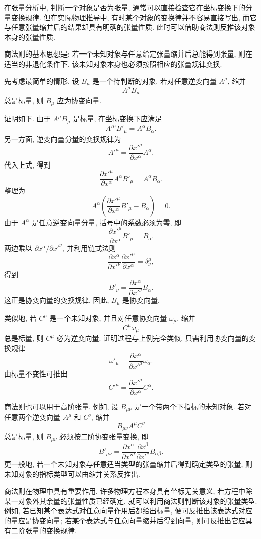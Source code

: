 在张量分析中, 判断一个对象是否为张量, 通常可以直接检查它在坐标变换下的分量变换规律. 但在实际物理推导中, 有时某个对象的变换律并不容易直接写出, 而它与任意张量缩并后的结果却具有明确的张量性质. 此时可以借助商法则反推该对象本身的张量性质. 

商法则的基本思想是: 若一个未知对象与任意给定张量缩并后总能得到张量, 则在适当的非退化条件下, 该未知对象本身也必须按照相应的张量规律变换. 

先考虑最简单的情形. 设 $B_{\mu}$ 是一个待判断的对象. 若对任意逆变向量 $A^{\mu}$, 缩并
\[
A^{\mu}B_{\mu}
\]
总是标量, 则 $B_{\mu}$ 应为协变向量. 

证明如下. 由于 $A^{\mu}B_{\mu}$ 是标量, 在坐标变换下应满足
\[
A'^{\mu}B'_{\mu}
=
A^{\alpha}B_{\alpha}.
\]
另一方面, 逆变向量分量的变换规律为
\[
A'^{\mu}
=
\frac{\partial x'^{\mu}}{\partial x^{\alpha}}A^{\alpha}.
\]
代入上式, 得到
\[
\frac{\partial x'^{\mu}}{\partial x^{\alpha}}A^{\alpha}B'_{\mu}
=
A^{\alpha}B_{\alpha}.
\]
整理为
\[
A^{\alpha}
\left(
\frac{\partial x'^{\mu}}{\partial x^{\alpha}}B'_{\mu}
-
B_{\alpha}
\right)
=
0.
\]
由于 $A^{\alpha}$ 是任意逆变向量分量, 括号中的系数必须为零, 即
\[
\frac{\partial x'^{\mu}}{\partial x^{\alpha}}B'_{\mu}
=
B_{\alpha}.
\]
两边乘以 $\partial x^{\alpha}/\partial x'^{\nu}$, 并利用链式法则
\[
\frac{\partial x^{\alpha}}{\partial x'^{\nu}}
\frac{\partial x'^{\mu}}{\partial x^{\alpha}}
=
\delta^{\mu}_{\nu},
\]
得到
\[
B'_{\nu}
=
\frac{\partial x^{\alpha}}{\partial x'^{\nu}}B_{\alpha}.
\]
这正是协变向量的变换规律. 因此, $B_{\mu}$ 是协变向量. 

类似地, 若 $C^{\mu}$ 是一个未知对象, 并且对任意协变向量 $\omega_{\mu}$, 缩并
\[
C^{\mu}\omega_{\mu}
\]
总是标量, 则 $C^{\mu}$ 必为逆变向量. 证明过程与上例完全类似, 只需利用协变向量的变换规律
\[
\omega'_{\mu}
=
\frac{\partial x^{\alpha}}{\partial x'^{\mu}}\omega_{\alpha}.
\]
由标量不变性可推出
\[
C'^{\mu}
=
\frac{\partial x'^{\mu}}{\partial x^{\alpha}}C^{\alpha}.
\]

商法则也可以用于高阶张量. 例如, 设 $B_{\mu\nu}$ 是一个带两个下指标的未知对象. 若对任意两个逆变向量 $A^{\mu}$ 和 $C^{\nu}$, 缩并
\[
B_{\mu\nu}A^{\mu}C^{\nu}
\]
总是标量, 则 $B_{\mu\nu}$ 必须按二阶协变张量变换, 即
\[
B'_{\mu\nu}
=
\frac{\partial x^{\alpha}}{\partial x'^{\mu}}
\frac{\partial x^{\beta}}{\partial x'^{\nu}}
B_{\alpha\beta}.
\]
更一般地, 若一个未知对象与任意适当类型的张量缩并后得到确定类型的张量, 则未知对象的指标类型可以由缩并关系反推出. 

商法则在物理中具有重要作用. 许多物理方程本身具有坐标无关意义, 若方程中除某一对象外其余量的张量性质已经确定, 就可以利用商法则判断该对象的张量类型. 例如, 若已知某个表达式对任意向量作用后都给出标量, 便可反推出该表达式对应的量应是协变向量; 若某个表达式与任意向量缩并后得到向量, 则可反推出它应具有二阶张量的变换规律. 

